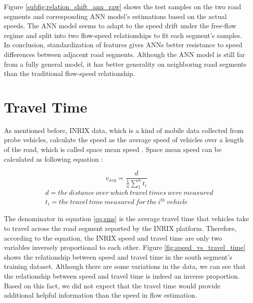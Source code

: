 \documentclass[english]{kththesis}
\begin{document}
Figure \ref{subfig:relation_shift_ann_raw} shows the test samples on the two road segments and corresponding ANN model's estimations based on the actual speeds. The ANN model seems to adapt to the speed drift under the free-flow regime and split into two flow-speed relationships to fit each segment's samples. In conclusion, standardization of features gives ANNs better resistance to speed differences between adjacent road segments. Although the ANN model is still far from a fully general model, it has better generality on neighboring road segments than the traditional flow-speed relationship.

\section{Travel Time}
\label{sec:discussionTravelTime}

As mentioned before, INRIX data, which is a kind of mobile data collected from probe vehicles, calculate the speed as the average speed of vehicles over a length of the road, which is called space mean speed \cite{sharma_inrix_data_opportunity, Ahsani_inrix_data_quantity}. Space mean speed can be calculated as following equation \cite{elefteriadou_traffic_flow_theory}:

\begin{equation}
    v_{avg} = \frac{d}{\frac{1}{n}\sum_{1}^{n}t_{i}}
    \label{eq:sms}
\end{equation}
\begin{align*}
    & d = the \ distance \ over \ which \ travel \ times \ were \ measured\\ 
    & t_i = the \ travel \ time \ measured \ for \ the \ i^{th} \ vehicle
\end{align*}

The denominator in equation \ref{eq:sms} is the average travel time that vehicles take to travel across the road segment reported by the INRIX platform. Therefore, according to the equation, the INRIX speed and travel time are only two variables inversely proportional to each other. Figure \ref{fig:speed_vs_travel_time} shows the relationship between speed and travel time in the south segment's training dataset. Although there are some variations in the data, we can see that the relationship between speed and travel time is indeed an inverse proportion. Based on this fact, we did not expect that the travel time would provide additional helpful information than the speed in flow estimation.
\end{document}
